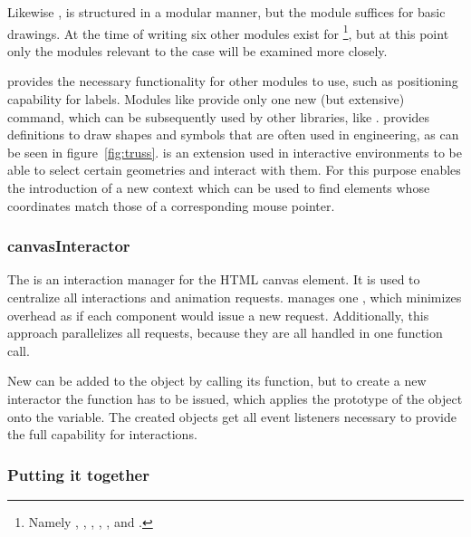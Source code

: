Likewise ,  is structured in a modular manner, but the  module suffices for basic drawings.
At the time of writing six other modules exist for \footnote{Namely , , , , ,  and .}, but at this point only the modules relevant to the case will be examined more closely.

 provides the necessary functionality for other modules to use, such as positioning capability for labels.
Modules like  provide only one new (but extensive) command, which can be subsequently used by other libraries, like .
 provides definitions to draw shapes and symbols that are often used in engineering, as can be seen in figure~\ref{fig:truss}.
 is an extension used in interactive environments to be able to select certain geometries and interact with them.
For this purpose  enables the introduction of a new context which can be used to find elements whose coordinates match those of a corresponding mouse pointer.

\subsubsection{canvasInteractor}\label{ch:canvas_interactor}

The  %
is an interaction manager for the HTML canvas element.
It is used to centralize all interactions and animation requests.
 manages one , which minimizes overhead as if each component would issue a new request.
Additionally, this approach parallelizes all requests, because they are all handled in one function call.

New  can be added to the  object by calling its  function, but to create a new interactor the  function has to be issued, which applies the prototype of the  object onto the variable.
The created objects get all event listeners necessary to provide the full capability for interactions.

\subsubsection{Putting it together}


